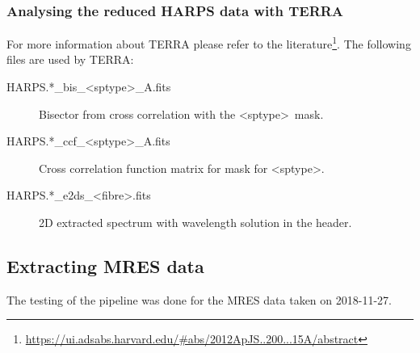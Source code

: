 \documentclass[10pt,a4paper]{article}
\begin{document}
\subsubsection{Analysing the reduced HARPS data with TERRA}
For more information about TERRA please refer to the literature\footnote{\url{https://ui.adsabs.harvard.edu/\#abs/2012ApJS..200...15A/abstract}}. The following files are used by TERRA:
\begin{description}
  \item[HARPS.*\_bis\_\textless sptype\textgreater\_A.fits] Bisector from cross correlation with the \textless sptype\textgreater\ mask.
  \item[HARPS.*\_ccf\_\textless sptype\textgreater\_A.fits] Cross correlation function matrix for mask for \textless sptype\textgreater.
  \item[HARPS.*\_e2ds\_\textless fibre\textgreater.fits] 2D extracted spectrum with wavelength solution in the header.
\end{description}

\subsection{Extracting MRES data}

The testing of the pipeline was done for the MRES data taken on 2018-11-27.
\end{document}

